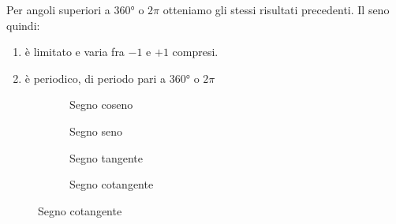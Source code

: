 Per angoli superiori a \ang{360} o $2\pi$ otteniamo gli stessi risultati precedenti. 
Il seno quindi:
\begin{enumerate}
	\item è limitato e varia fra $-1$ e $+1$ compresi.
	\item è periodico, di periodo pari a \ang{360} o $2\pi$
\end{enumerate} 
\begin{figure}
	\centering
	
	\label{fig:AndamentoSeno2}
\end{figure}%
\begin{figure}
	\begin{subfigure}[b]{.5\linewidth}
		\centering
		\caption{Segno coseno}\label{fig:SegnoCoseno}
	\end{subfigure}%
	\begin{subfigure}[b]{.5\linewidth}
		\centering
		\caption{Segno seno}\label{fig:SegnoSeno}
	\end{subfigure}
	\begin{subfigure}[b]{.5\linewidth}
		\centering
		\caption{Segno tangente}\label{fig:SegnoTangente}
	\end{subfigure}%
	\begin{subfigure}[b]{.5\linewidth}
		\centering
		\caption{Segno cotangente}\label{fig:SegnoCotangente}
	\end{subfigure}
	\label{tab:segnofunzionigoniometriche}
\end{figure}
